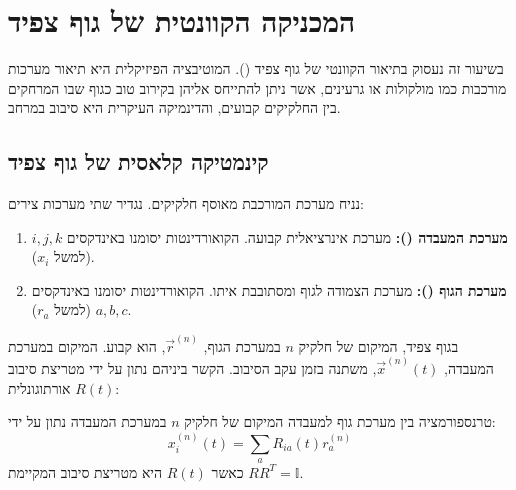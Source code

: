 \section{המכניקה הקוונטית של גוף צפיד }

בשיעור זה נעסוק בתיאור הקוונטי של גוף צפיד (). המוטיבציה הפיזיקלית היא תיאור מערכות מורכבות כמו מולקולות או גרעינים, אשר ניתן להתייחס אליהן בקירוב טוב כגוף שבו המרחקים בין החלקיקים קבועים, והדינמיקה העיקרית היא סיבוב במרחב.

\subsection{קינמטיקה קלאסית של גוף צפיד}

נניח מערכת המורכבת מאוסף חלקיקים. נגדיר שתי מערכות צירים:
\begin{enumerate}
    \item \textbf{מערכת המעבדה ():} מערכת אינרציאלית קבועה. הקואורדינטות יסומנו באינדקסים $i, j, k$ (למשל $x_i$).
    \item \textbf{מערכת הגוף ():} מערכת הצמודה לגוף ומסתובבת איתו. הקואורדינטות יסומנו באינדקסים $a, b, c$ (למשל $r_a$).
\end{enumerate}

בגוף צפיד, המיקום של חלקיק $n$ במערכת הגוף, $\vec{r}^{(n)}$, הוא קבוע. המיקום במערכת המעבדה, $\vec{x}^{(n)}(t)$, משתנה בזמן עקב הסיבוב. הקשר ביניהם נתון על ידי מטריצת סיבוב אורתוגונלית $R(t)$:

\begin{definitionbox}{טרנספורמציה בין מערכת גוף למעבדה}
המיקום של חלקיק $n$ במערכת המעבדה נתון על ידי:
\begin{equation}
    x^{(n)}_i(t) = \sum_a R_{ia}(t) r^{(n)}_a
\end{equation}
כאשר $R(t)$ היא מטריצת סיבוב המקיימת $R R^T = \mathbb{I}$.
\end{definitionbox}

